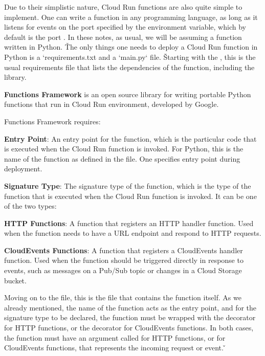 Due to their simplistic nature, Cloud Run functions are also quite simple to implement. One can write a function in
any programming language, as long as it listens for events on the port specified by the  environment
variable, which by default is the port . In these notes, as usual, we will be assuming a function written in
Python. \v

The only things one needs to deploy a Cloud Run function in Python is a `requirements.txt and a `main.py` file. \v

Starting with the , this is the usual requirements file that lists the dependencies of the
function, including the  library.

\textbf{Functions Framework} is an open source library for writing portable Python functions that run in Cloud Run
environment, developed by Google.
\ed

Functions Framework requires:
\bit
\item \textbf{Entry Point}: An entry point for the function, which is the particular code that is executed when
the Cloud Run function is invoked. For Python, this is the name of the function as defined in the  file.
One specifies  entry point during deployment.
\item \textbf{Signature Type}: The signature type of the function, which is the type of the function that is executed
when the Cloud Run function is invoked. It can be one of the two types:
\bit
\item \textbf{HTTP Functions}: A function that registers an HTTP handler function. Used when the function needs to
have a URL endpoint and respond to HTTP requests.
\item \textbf{CloudEvents Functions}: A function that registers a CloudEvents handler function. Used when the function
should be triggered directly in response to events, such as messages on a Pub/Sub topic or changes in a Cloud Storage
bucket.
\eit
\eit

Moving on to the  file, this is the file that contains the function itself. As we already mentioned,
the name of the function acts as the entry point, and for the signature type to be declared, the function must be
wrapped with the  decorator for HTTP functions, or the
 decorator for CloudEvents functions. In both cases, the function must have
an argument called  for HTTP functions, or  for CloudEvents functions, that
represents the incoming request or event. \v


